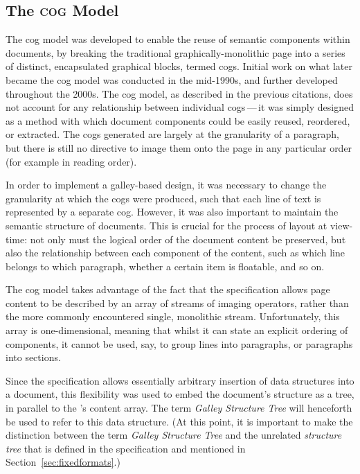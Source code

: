 \subsection{The \textsc{cog} Model}
The \gls{cog} model was developed to enable the reuse of semantic components within \pdf{} documents, by breaking the traditional graphically-monolithic \pdf{} page into a series of distinct, encapsulated graphical blocks, termed \glspl{cog}. Initial work on what later became the \gls{cog} model was conducted in the mid-1990s,\hspace{0pt}\cite{Smith1995} and further developed throughout the 2000s.\hspace{0pt}\cite{Bagley2003,Bagley2004a,Bagley2005,Macdonald2005,Bagley2006,Bagley2007} The \gls{cog} model, as described in the previous citations, does not account for any relationship between individual \glspl{cog}\,---\,it was simply designed as a method with which document components could be easily reused, reordered, or extracted. The \glspl{cog} generated are largely at the granularity of a paragraph, but there is still no directive to image them onto the page in any particular order (for example in reading order).

In order to implement a galley-based design, it was necessary to change the granularity at which the \glspl{cog} were produced, such that each line of text is represented by a separate \gls{cog}. However, it was also important to maintain the semantic structure of documents. This is crucial for the process of layout at view-time: not only must the logical order of the document content be preserved, but also the relationship between each component of the content, such as which line belongs to which paragraph, whether a certain item is floatable, and so on.

The \gls{cog} model takes advantage of the fact that the \pdf{} specification\hspace{0pt}\cite{ASI2001} allows page content to be described by an array of streams of imaging operators, rather than the more commonly encountered single, monolithic stream. Unfortunately, this array is one-di\-men\-sional, meaning that whilst it can state an explicit ordering of components, it cannot be used, say, to group lines into paragraphs, or paragraphs into sections.

Since the \pdf{} specification allows essentially arbitrary  insertion of data structures into a document, this flexibility was used to embed the document's structure as a tree, in parallel to the \pdf{}'s content array. The term \emph{Galley Structure Tree} will henceforth be used to refer to this data structure. (At this point, it is important to make the distinction between the term \emph{Galley Structure Tree} and the unrelated \emph{structure tree} that is defined in the \pdf{} specification and mentioned in Section~\ref{sec:fixedformats}.)

